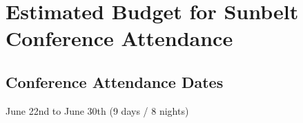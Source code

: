 \vspace{0.5cm}
\section{Estimated Budget for Sunbelt Conference Attendance}

\vspace{0.5cm}

\subsection{Conference Attendance Dates}
June 22nd to June 30th (9 days / 8 nights)

\vspace{0.5cm}

